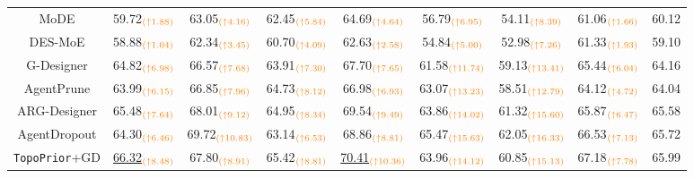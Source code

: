 \documentclass[lettersize,journal]{IEEEtran}
\theoremstyle{plain}
\begin{document}
\begin{table}[!t]
\begin{tabular}{ccccccccc}
MoDE & 59.72$_{\textcolor{orange}{(\uparrow 1.88)}}$ & 63.05$_{\textcolor{orange}{(\uparrow 4.16)}}$ & 62.45$_{\textcolor{orange}{(\uparrow 5.84)}}$ & 64.69$_{\textcolor{orange}{(\uparrow 4.64)}}$ & 56.79$_{\textcolor{orange}{(\uparrow 6.95)}}$ & 54.11$_{\textcolor{orange}{(\uparrow 8.39)}}$ & 61.06$_{\textcolor{orange}{(\uparrow 1.66)}}$ & 60.12 \\
DES-MoE & 58.88$_{\textcolor{orange}{(\uparrow 1.04)}}$ & 62.34$_{\textcolor{orange}{(\uparrow 3.45)}}$ & 60.70$_{\textcolor{orange}{(\uparrow 4.09)}}$ & 62.63$_{\textcolor{orange}{(\uparrow 2.58)}}$ & 54.84$_{\textcolor{orange}{(\uparrow 5.00)}}$ & 52.98$_{\textcolor{orange}{(\uparrow 7.26)}}$ & 61.33$_{\textcolor{orange}{(\uparrow 1.93)}}$ & 59.10 \\ \hdashline
G-Designer & 64.82$_{\textcolor{orange}{(\uparrow 6.98)}}$ & 66.57$_{\textcolor{orange}{(\uparrow 7.68)}}$ & 63.91$_{\textcolor{orange}{(\uparrow 7.30)}}$ & 67.70$_{\textcolor{orange}{(\uparrow 7.65)}}$ & 61.58$_{\textcolor{orange}{(\uparrow 11.74)}}$ & 59.13$_{\textcolor{orange}{(\uparrow 13.41)}}$ & 65.44$_{\textcolor{orange}{(\uparrow 6.04)}}$ & 64.16  \\
AgentPrune & 63.99$_{\textcolor{orange}{(\uparrow 6.15)}}$ & 66.85$_{\textcolor{orange}{(\uparrow 7.96)}}$ & 64.73$_{\textcolor{orange}{(\uparrow 8.12)}}$ & 66.98$_{\textcolor{orange}{(\uparrow 6.93)}}$ & 63.07$_{\textcolor{orange}{(\uparrow 13.23)}}$ & 58.51$_{\textcolor{orange}{(\uparrow 12.79)}}$ & 64.12$_{\textcolor{orange}{(\uparrow 4.72)}}$ & 64.04 \\
ARG-Designer & 65.48$_{\textcolor{orange}{(\uparrow 7.64)}}$ & 68.01$_{\textcolor{orange}{(\uparrow 9.12)}}$ & 64.95$_{\textcolor{orange}{(\uparrow 8.34)}}$ & 69.54$_{\textcolor{orange}{(\uparrow 9.49)}}$ & 63.86$_{\textcolor{orange}{(\uparrow 14.02)}}$ & 61.32$_{\textcolor{orange}{(\uparrow 15.60)}}$ & 65.87$_{\textcolor{orange}{(\uparrow 6.47)}}$ & 65.58 \\
AgentDropout & 64.30$_{\textcolor{orange}{(\uparrow 6.46)}}$ & 69.72$_{\textcolor{orange}{(\uparrow 10.83)}}$ & 63.14$_{\textcolor{orange}{(\uparrow 6.53)}}$ & 68.86$_{\textcolor{orange}{(\uparrow 8.81)}}$ & 65.47$_{\textcolor{orange}{(\uparrow 15.63)}}$ & 62.05$_{\textcolor{orange}{(\uparrow 16.33)}}$ & 66.53$_{\textcolor{orange}{(\uparrow 7.13)}}$ & 65.72 \\ \hdashline
\rowcolor{mylightgray} {\texttt{TopoPrior}+GD} & \underline{66.32}$_{\textcolor{orange}{(\uparrow 8.48)}}$ & 67.80$_{\textcolor{orange}{(\uparrow 8.91)}}$ & 65.42$_{\textcolor{orange}{(\uparrow 8.81)}}$ & \underline{70.41}$_{\textcolor{orange}{(\uparrow 10.36)}}$ & 63.96$_{\textcolor{orange}{(\uparrow 14.12)}}$ & 60.85$_{\textcolor{orange}{(\uparrow 15.13)}}$ & 67.18$_{\textcolor{orange}{(\uparrow 7.78)}}$ & 65.99  \\

\end{tabular}
\end{table}
\end{document}
